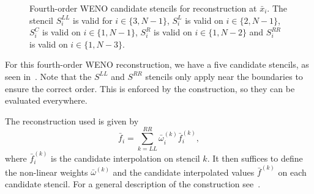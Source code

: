\documentclass{scrartcl}
\begin{document}
\begin{figure}[H]
\centering
{}
\caption{
    Fourth-order WENO candidate stencils for reconstruction at $\bar{x}_i$.
    The stencil $S^{LL}_i$ is valid for $i \in \{3, N - 1\}$, $S^L_i$ is
    valid on $i \in \{2, N - 1\}$, $S^C_i$ is valid on $i \in \{1, N - 1\}$,
    $S^R_i$ is valid on $i \in \{1, N - 2\}$ and $S^{RR}_i$ is valid on
    $i \in \{1, N - 3\}$.}
\label{fig:weno:stencils}
\end{figure}

For this fourth-order WENO reconstruction, we have a five candidate stencils, as
seen in~. Note that the $S^{LL}$ and $S^{RR}$ stencils only
apply near the boundaries to ensure the correct order. This is enforced by the
construction, so they can be evaluated everywhere.

The reconstruction used is given by
\begin{equation} \label{eq:weno:reconstruction}
\bar{f}_i = \sum_{k = LL}^{RR} \bar{\omega}_i^{(k)} \bar{f}^{(k)}_i,
\end{equation}
where $\bar{f}^{(k)}_i$ is the candidate interpolation on stencil $k$. It then
suffices to define the non-linear weights $\bar{\omega}^{(k)}$ and the candidate
interpolated values $\bar{f}^{(k)}$ on each candidate stencil. For a general
description of the construction see~.
\end{document}
